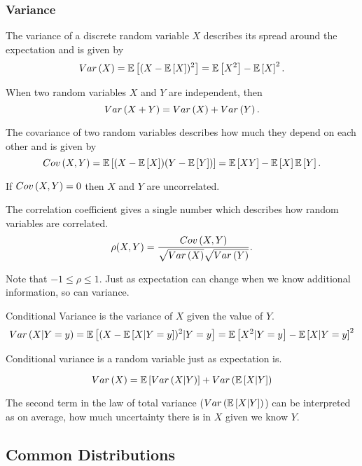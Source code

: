 \subsubsection{Variance}
\begin{definition}
  The variance of a discrete random variable $X$ describes its spread around the expectation and is given by
  \[
	Var\left(X\right) = \mathbb{E}\left[(X-\mathbb{E}\left[X\right])^2\right] = \mathbb{E}\left[X^2\right]-\mathbb{E}\left[X\right]^2.
  \]
  \label{defn:drv-variance}
\end{definition}
\begin{theorem}
  When two random variables $X$ and $Y$ are independent, then 
  \[
	Var\left(X+Y\right) = Var\left(X\right) + Var\left(Y\right).
  \]
  \label{defn:indep-var}
\end{theorem}
\begin{definition}
  The covariance of two random variables describes how much they depend on each other and is given by
  \[
	Cov\left(X, Y\right) = \mathbb{E}\left[(X-\mathbb{E}\left[X\right])(Y-\mathbb{E}\left[Y\right])\right] = \mathbb{E}\left[XY\right] - \mathbb{E}\left[X\right]\mathbb{E}\left[Y\right].
  \]
  \label{defn:cov}
\end{definition}
If $Cov\left(X,Y\right) = 0$ then $X$ and $Y$ are uncorrelated.
\begin{definition}
  The correlation coefficient gives a single number which describes how random variables are correlated.
  \[
	\rho(X, Y) = \frac{Cov\left(X, Y\right)}{\sqrt{Var\left(X\right)}\sqrt{Var\left(Y\right)}}.
  \]
  \label{defn:correlation}
\end{definition}
Note that $-1\leq \rho \leq 1$.
Just as expectation can change when we know additional information, so can variance.
\begin{definition}
  Conditional Variance is the variance of $X$ given the value of $Y$.
  \[
	Var\left(X|Y=y\right) = \mathbb{E}\left[(X - \mathbb{E}\left[X|Y=y\right])^2 | Y=y\right] = \mathbb{E}\left[X^2|Y=y\right] - \mathbb{E}\left[X|Y=y\right]^2
  \]
  \label{defn:conditional-var}
\end{definition}
Conditional variance is a random variable just as expectation is.
\begin{theorem}
  \[
	Var\left(X\right) = \mathbb{E}\left[Var\left(X|Y\right)\right] + Var\left(\mathbb{E}\left[X|Y\right]\right)
  \]
  \label{thm:total-variance}
\end{theorem}
The second term in the law of total variance ($Var\left(\mathbb{E}\left[X|Y\right]\right)$) can be interpreted as on average, how much uncertainty there is in $X$ given we know $Y$.
\subsection{Common Distributions}
